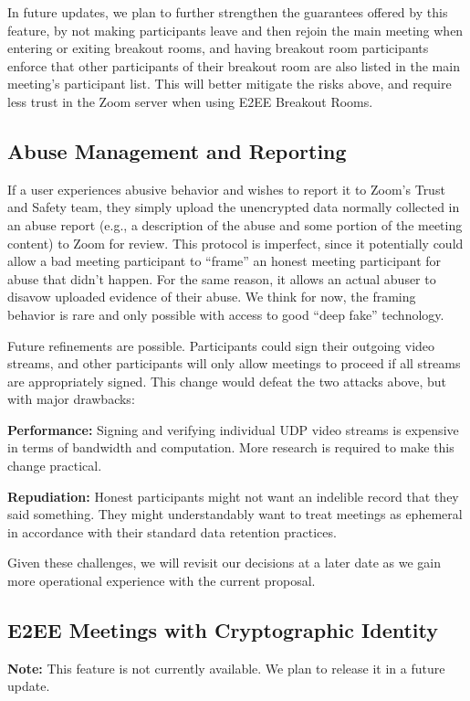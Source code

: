 In future updates, we plan to further strengthen the guarantees offered by this feature, by not
making participants leave and then rejoin the main meeting when entering or exiting breakout rooms,
and having breakout room participants enforce that other participants of their breakout room are
also listed in the main meeting's participant list. This will better mitigate the risks above, and
require less trust in the Zoom server when using E2EE Breakout Rooms.

\subsection{Abuse Management and Reporting}
If a user experiences abusive behavior and wishes to report it to Zoom's Trust and Safety team, they
simply upload the unencrypted data normally collected in an abuse report (e.g., a description of the
abuse and some portion of the meeting content) to Zoom for review. This protocol is imperfect, since
it potentially could allow a bad meeting participant to ``frame'' an honest meeting participant for
abuse that didn't happen. For the same reason, it allows an actual abuser to disavow uploaded
evidence of their abuse. We think for now, the framing behavior is rare and only possible with
access to good ``deep fake'' technology.

Future refinements are possible. Participants could sign their outgoing video streams, and other
participants will only allow meetings to proceed if all streams are appropriately signed. This
change would defeat the two attacks above, but with major drawbacks:
%
\begin{description}
    \item {\bf Performance:} Signing and verifying individual UDP video streams is expensive in
    terms of bandwidth and computation. More research is required to make this change practical.
    \item {\bf Repudiation:} Honest participants might not want an indelible record that they said
    something. They might understandably want to treat meetings as ephemeral in accordance with
    their standard data retention practices.
\end{description}

Given these challenges, we will revisit our decisions at a later date as we gain more operational
experience with the current proposal.

\subsection{E2EE Meetings with Cryptographic Identity}
\label{subsec:keyagreementidentity}
\textbf{Note:} This feature is not currently available. We plan to release it in a future update.

